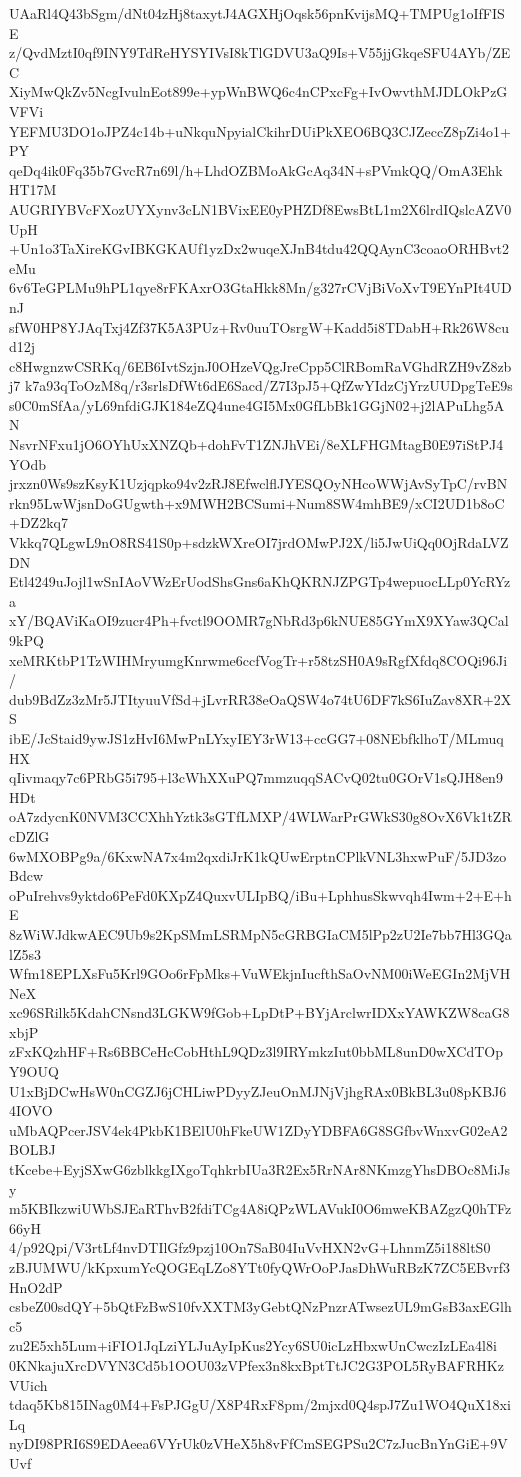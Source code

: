 UAaRl4Q43bSgm/dNt04zHj8taxytJ4AGXHjOqsk56pnKvijsMQ+TMPUg1oIfFISE
z/QvdMztI0qf9INY9TdReHYSYIVsI8kTlGDVU3aQ9Is+V55jjGkqeSFU4AYb/ZEC
XiyMwQkZv5NcgIvulnEot899e+ypWnBWQ6c4nCPxcFg+IvOwvthMJDLOkPzGVFVi
YEFMU3DO1oJPZ4c14b+uNkquNpyialCkihrDUiPkXEO6BQ3CJZeccZ8pZi4o1+PY
qeDq4ik0Fq35b7GvcR7n69l/h+LhdOZBMoAkGcAq34N+sPVmkQQ/OmA3EhkHT17M
AUGRIYBVcFXozUYXynv3cLN1BVixEE0yPHZDf8EwsBtL1m2X6lrdIQslcAZV0UpH
+Un1o3TaXireKGvIBKGKAUf1yzDx2wuqeXJnB4tdu42QQAynC3coaoORHBvt2eMu
6v6TeGPLMu9hPL1qye8rFKAxrO3GtaHkk8Mn/g327rCVjBiVoXvT9EYnPIt4UDnJ
sfW0HP8YJAqTxj4Zf37K5A3PUz+Rv0uuTOsrgW+Kadd5i8TDabH+Rk26W8cud12j
c8HwgnzwCSRKq/6EB6IvtSzjnJ0OHzeVQgJreCpp5ClRBomRaVGhdRZH9vZ8zbj7
k7a93qToOzM8q/r3srlsDfWt6dE6Sacd/Z7I3pJ5+QfZwYIdzCjYrzUUDpgTeE9s
s0C0mSfAa/yL69nfdiGJK184eZQ4une4GI5Mx0GfLbBk1GGjN02+j2lAPuLhg5AN
NsvrNFxu1jO6OYhUxXNZQb+dohFvT1ZNJhVEi/8eXLFHGMtagB0E97iStPJ4YOdb
jrxzn0Ws9szKsyK1Uzjqpko94v2zRJ8EfwclflJYESQOyNHcoWWjAvSyTpC/rvBN
rkn95LwWjsnDoGUgwth+x9MWH2BCSumi+Num8SW4mhBE9/xCI2UD1b8oC+DZ2kq7
Vkkq7QLgwL9nO8RS41S0p+sdzkWXreOI7jrdOMwPJ2X/li5JwUiQq0OjRdaLVZDN
Etl4249uJojl1wSnIAoVWzErUodShsGns6aKhQKRNJZPGTp4wepuocLLp0YcRYza
xY/BQAViKaOI9zucr4Ph+fvctl9OOMR7gNbRd3p6kNUE85GYmX9XYaw3QCal9kPQ
xeMRKtbP1TzWIHMryumgKnrwme6ccfVogTr+r58tzSH0A9sRgfXfdq8COQi96Ji/
dub9BdZz3zMr5JTItyuuVfSd+jLvrRR38eOaQSW4o74tU6DF7kS6IuZav8XR+2XS
ibE/JcStaid9ywJS1zHvI6MwPnLYxyIEY3rW13+ccGG7+08NEbfklhoT/MLmuqHX
qIivmaqy7c6PRbG5i795+l3cWhXXuPQ7mmzuqqSACvQ02tu0GOrV1sQJH8en9HDt
oA7zdycnK0NVM3CCXhhYztk3sGTfLMXP/4WLWarPrGWkS30g8OvX6Vk1tZRcDZlG
6wMXOBPg9a/6KxwNA7x4m2qxdiJrK1kQUwErptnCPlkVNL3hxwPuF/5JD3zoBdcw
oPuIrehvs9yktdo6PeFd0KXpZ4QuxvULIpBQ/iBu+LphhusSkwvqh4Iwm+2+E+hE
8zWiWJdkwAEC9Ub9s2KpSMmLSRMpN5cGRBGIaCM5lPp2zU2Ie7bb7Hl3GQalZ5s3
Wfm18EPLXsFu5Krl9GOo6rFpMks+VuWEkjnIucfthSaOvNM00iWeEGIn2MjVHNeX
xc96SRilk5KdahCNsnd3LGKW9fGob+LpDtP+BYjArclwrIDXxYAWKZW8caG8xbjP
zFxKQzhHF+Rs6BBCeHcCobHthL9QDz3l9IRYmkzIut0bbML8unD0wXCdTOpY9OUQ
U1xBjDCwHsW0nCGZJ6jCHLiwPDyyZJeuOnMJNjVjhgRAx0BkBL3u08pKBJ64IOVO
uMbAQPcerJSV4ek4PkbK1BElU0hFkeUW1ZDyYDBFA6G8SGfbvWnxvG02eA2BOLBJ
tKcebe+EyjSXwG6zblkkgIXgoTqhkrbIUa3R2Ex5RrNAr8NKmzgYhsDBOc8MiJsy
m5KBIkzwiUWbSJEaRThvB2fdiTCg4A8iQPzWLAVukI0O6mweKBAZgzQ0hTFz66yH
4/p92Qpi/V3rtLf4nvDTIlGfz9pzj10On7SaB04IuVvHXN2vG+LhnmZ5i188ltS0
zBJUMWU/kKpxumYcQOGEqLZo8YTt0fyQWrOoPJasDhWuRBzK7ZC5EBvrf3HnO2dP
csbeZ00sdQY+5bQtFzBwS10fvXXTM3yGebtQNzPnzrATwsezUL9mGsB3axEGlhc5
zu2E5xh5Lum+iFIO1JqLziYLJuAyIpKus2Ycy6SU0icLzHbxwUnCwczIzLEa4l8i
0KNkajuXrcDVYN3Cd5b1OOU03zVPfex3n8kxBptTtJC2G3POL5RyBAFRHKzVUich
tdaq5Kb815INag0M4+FsPJGgU/X8P4RxF8pm/2mjxd0Q4spJ7Zu1WO4QuX18xiLq
nyDI98PRI6S9EDAeea6VYrUk0zVHeX5h8vFfCmSEGPSu2C7zJucBnYnGiE+9VUvf
